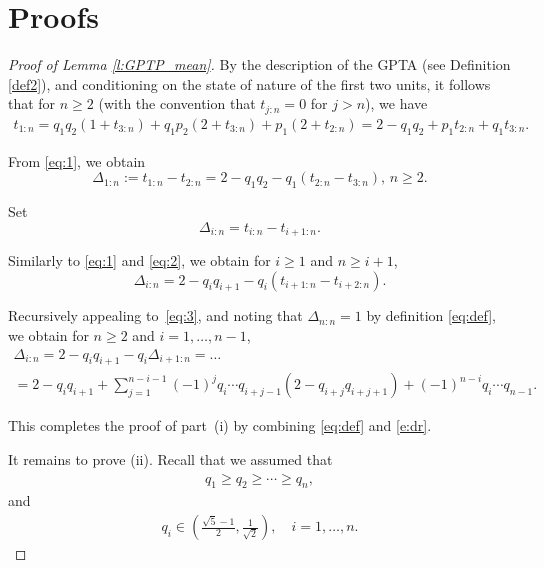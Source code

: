 \documentclass[12pt]{article}
\begin{document}
\section{Proofs}\label{s:proofs}
\begin{proof}[Proof of Lemma \ref{l:GPTP_mean}]
By the description of the {GPTA} (see Definition \ref{def2}), and conditioning on the state of nature of the first two units, it follows that for \( n \geq 2 \) (with the convention that \( t_{j:n} = 0 \) for \( j > n \)), we have
\begin{multline}
\label{eq:1}
    t_{1:n}=q_1q_2(1+t_{3:n})+q_1p_2(2+t_{3:n})+p_1(2+t_{2:n})=
    2-q_1q_2+p_1t_{2:n}+q_1t_{3:n}.
\end{multline}


From \eqref{eq:1}, we obtain
\begin{equation}
\label{eq:2}
    \Delta_{1:n}:=t_{1:n}-t_{2:n}=2-q_1q_2-q_1(t_{2:n}-t_{3:n}),\,n\geq 2.
\end{equation}

Set
\begin{equation}
\label{eq:def}
\Delta_{i:n}= t_{i:n} - t_{i+1:n}.
\end{equation}

Similarly to \eqref{eq:1} and \eqref{eq:2}, we obtain for \( {i \geq 1} \) and ${n\geq i+1}$,
\begin{equation}
\label{eq:3}
    \Delta_{i:n}=2-q_iq_{i+1}-q_i(t_{i+1:n}-t_{i+2:n}).
\end{equation}


Recursively appealing to~\eqref{eq:3}, and noting that \( \Delta_{n:n} = 1 \) by definition \eqref{eq:def}, we obtain for \( n \geq 2 \) and $i=1,
\ldots,n-1$,
\begin{multline}\label{e:dr}
    \Delta_{i:n}
    = 2 - q_i q_{i+1} - q_i \Delta_{i+1:n}= \dots \\[6pt]
    = 2 - q_i q_{i+1} + {\sum_{j=1}^{n - i - 1} (-1)^j q_i \cdots q_{i + j - 1} \left( 2 - q_{i + j} q_{i + j + 1} \right) + (-1)^{n - i} q_i \cdots q_{n - 1}}.
\end{multline}


This completes the proof of part~(i) by combining \eqref{eq:def} and \eqref{e:dr}.



It remains to prove (ii). Recall that we assumed that
\begin{align}
\label{eq:A1}
q_1 \geq q_2 \geq \cdots \geq q_n,
\end{align}
and
\begin{align}
\label{eq:A2}
q_i \in \left( \frac{\sqrt{5}-1}{2}, \frac{1}{\sqrt{2}} \right), \quad i = 1, \ldots, n.
\end{align}


\end{proof}
\end{document}
